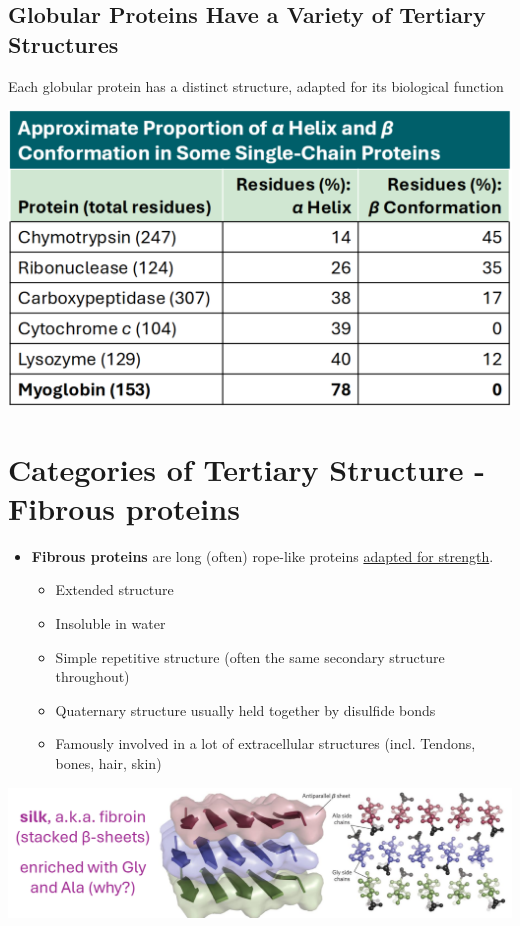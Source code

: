 \documentclass[10pt]{article}
\begin{document}
\subsection*{Globular Proteins Have a Variety of Tertiary Structures}
Each globular protein has a distinct structure, adapted for its biological function
\begin{center}
    \includegraphics*[scale=0.4]{L1_5.png}
\end{center}

\section*{Categories of Tertiary Structure - Fibrous proteins}
\begin{itemize}
    \item \textbf{Fibrous proteins} are long (often) rope-like proteins \underline{adapted for strength}.
    \begin{itemize}
        \item Extended structure
        \item Insoluble in water
        \item Simple repetitive structure (often the same secondary structure throughout)
        \item Quaternary structure usually held together by disulfide bonds
        \item Famously involved in a lot of extracellular structures (incl. Tendons, bones, hair, skin)
    \end{itemize}
\end{itemize}
\begin{center}
    \includegraphics*[width=\textwidth]{L1_6.png}
\end{center}
\end{document}
